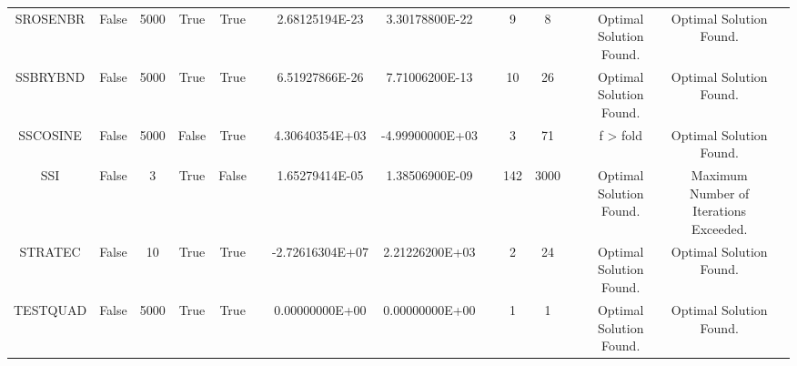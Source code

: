 \begin{longtable}{ccccccccccccccc}
	\cellcolor{default2} SROSENBR& \cellcolor{default2} False& \cellcolor{default2} 5000& \cellcolor{default2} True& \cellcolor{default2} True& \cellcolor{header} & \cellcolor{best} 2.68125194E-23& \cellcolor{ok} 3.30178800E-22& \cellcolor{header} & \cellcolor{ok} 9& \cellcolor{best} 8& \cellcolor{header} & \cellcolor{default2} Optimal Solution Found.& \cellcolor{default2} Optimal Solution Found.& \cellcolor{header} \\
	\cellcolor{default1} SSBRYBND& \cellcolor{default1} False& \cellcolor{default1} 5000& \cellcolor{default1} True& \cellcolor{default1} True& \cellcolor{header} & \cellcolor{best} 6.51927866E-26& \cellcolor{ok} 7.71006200E-13& \cellcolor{header} & \cellcolor{best} 10& \cellcolor{poor} 26& \cellcolor{header} & \cellcolor{default1} Optimal Solution Found.& \cellcolor{default1} Optimal Solution Found.& \cellcolor{header} \\
	\cellcolor{default2} SSCOSINE& \cellcolor{default2} False& \cellcolor{default2} 5000& \cellcolor{default2} False& \cellcolor{default2} True& \cellcolor{header} & \cellcolor{poor} 4.30640354E+03& \cellcolor{best} -4.99900000E+03& \cellcolor{header} & \cellcolor{best} 3& \cellcolor{poor} 71& \cellcolor{header} & \cellcolor{default2} f > fold& \cellcolor{default2} Optimal Solution Found.& \cellcolor{header} \\
	\cellcolor{default1} SSI& \cellcolor{default1} False& \cellcolor{default1} 3& \cellcolor{default1} True& \cellcolor{default1} False& \cellcolor{header} & \cellcolor{ok} 1.65279414E-05& \cellcolor{best} 1.38506900E-09& \cellcolor{header} & \cellcolor{best} 142& \cellcolor{poor} 3000& \cellcolor{header} & \cellcolor{default1} Optimal Solution Found.& \cellcolor{default1} Maximum Number of Iterations Exceeded.& \cellcolor{header} \\
	\cellcolor{default2} STRATEC& \cellcolor{default2} False& \cellcolor{default2} 10& \cellcolor{default2} True& \cellcolor{default2} True& \cellcolor{header} & \cellcolor{best} -2.72616304E+07& \cellcolor{poor} 2.21226200E+03& \cellcolor{header} & \cellcolor{best} 2& \cellcolor{poor} 24& \cellcolor{header} & \cellcolor{default2} Optimal Solution Found.& \cellcolor{default2} Optimal Solution Found.& \cellcolor{header} \\
	\cellcolor{default1} TESTQUAD& \cellcolor{default1} False& \cellcolor{default1} 5000& \cellcolor{default1} True& \cellcolor{default1} True& \cellcolor{header} & \cellcolor{best} 0.00000000E+00& \cellcolor{best} 0.00000000E+00& \cellcolor{header} & \cellcolor{best} 1& \cellcolor{best} 1& \cellcolor{header} & \cellcolor{default1} Optimal Solution Found.& \cellcolor{default1} Optimal Solution Found.& \cellcolor{header} \\

\end{longtable}

